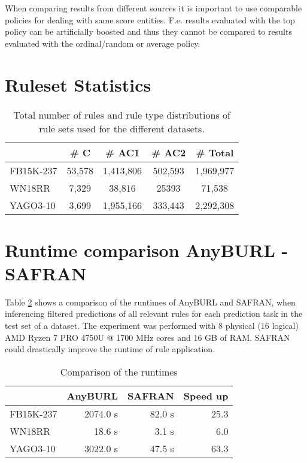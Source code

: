 \documentclass[akbc,twoside,11pt,lettersize]{article}
\begin{document}
When comparing results from different sources it is important to use comparable policies for dealing with same score entities. F.e. results evaluated with the top policy can be artificially boosted and thus they cannot be compared to results evaluated with the ordinal/random or average policy.

\section{Ruleset Statistics}

\begin{table}[H]
    \centering
    \begin{tabular}{lcccc}
    \hline
         & \# C & \# AC1 & \# AC2 & \# Total \\ \hline
        FB15K-237 & 53,578 & 1,413,806 & 502,593 & 1,969,977 \\
        WN18RR & 7,329 & 38,816 & 25393 & 71,538 \\ 
        YAGO3-10 & 3,699 & 1,955,166 & 333,443 & 2,292,308 \\ \hline
    \end{tabular}
    \caption{ Total number of rules and rule type distributions of rule sets used for the different datasets.}
    \label{numrules}
\end{table}

\section{Runtime comparison AnyBURL - SAFRAN}

Table \ref{runtimes} shows a comparison of the runtimes of AnyBURL and SAFRAN, when inferencing filtered predictions of all relevant rules for each prediction task in the test set of a dataset. The experiment was performed with 8 physical (16 logical) AMD Ryzen 7 PRO 4750U @ 1700 MHz cores and 16 GB of RAM. SAFRAN could drastically improve the runtime of rule application.

\begin{table}[H]
    \centering
    \begin{tabular}{lrrr}
         & AnyBURL & SAFRAN & Speed up \\ \hline
        FB15K-237 & 2074.0 s & 82.0 s & 25.3 \\
        WN18RR & 18.6 s & 3.1 s & 6.0 \\
        YAGO3-10 & 3022.0 s & 47.5 s & 63.3 \\ \hline
    \end{tabular}
    \caption{ Comparison of the runtimes }

    \label{runtimes}
\end{table}
\end{document}
